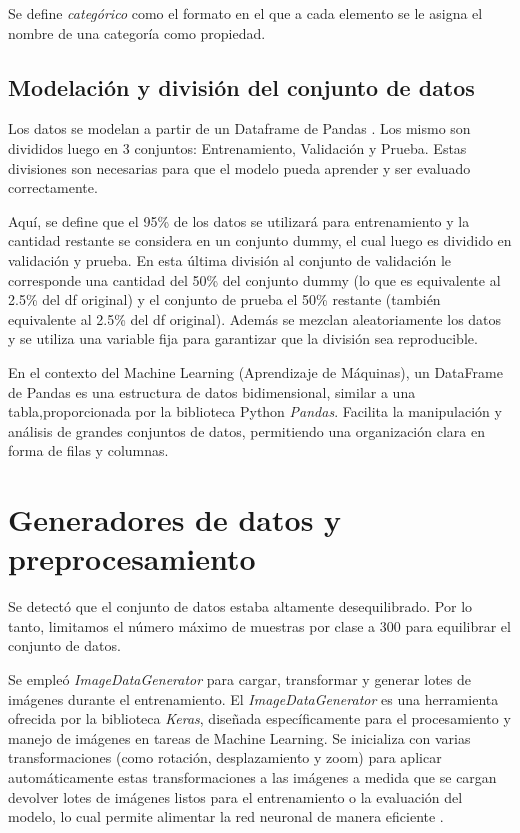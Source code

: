 Se define \textit{categórico} como el formato en el que a cada elemento se le asigna el nombre de una categoría como propiedad.

\subsection{Modelación y división del conjunto de datos}

Los datos se modelan a partir de un Dataframe de Pandas  \cite{pandas}. Los mismo son divididos luego en 3 conjuntos: Entrenamiento, Validación y Prueba. 
Estas divisiones son necesarias para que el modelo pueda aprender y ser evaluado correctamente. 
 
Aquí, se define que el 95\% de los datos se utilizará para entrenamiento y la cantidad restante se considera en un conjunto dummy, el cual  luego es dividido en validación y prueba. En esta última división al conjunto de validación le corresponde una cantidad del 50\% del conjunto  dummy (lo que es equivalente al 2.5\% del df original) y el conjunto de prueba el 50\% restante (también equivalente al 2.5\% del df original). Además se mezclan aleatoriamente los datos y se utiliza una variable fija para garantizar que la división sea reproducible.

En el contexto del Machine Learning (Aprendizaje de Máquinas), un DataFrame de Pandas es una estructura de datos bidimensional, similar a una tabla,proporcionada por la biblioteca Python \textit{Pandas}. Facilita la manipulación y análisis de grandes conjuntos de datos, permitiendo una organización clara en forma de filas y columnas.

\section{Generadores de datos y preprocesamiento}

Se detectó que el conjunto de datos estaba altamente desequilibrado. Por lo tanto, limitamos el número máximo de muestras por clase a 300 para equilibrar el conjunto de datos. 

Se empleó \textit{ImageDataGenerator} \cite{img_gen} para cargar, transformar y generar lotes de imágenes durante el entrenamiento. El \textit{ImageDataGenerator} es una herramienta ofrecida por la biblioteca \textit{Keras}, diseñada específicamente para el procesamiento y manejo de imágenes en 
tareas de Machine Learning. Se inicializa con varias transformaciones (como rotación, desplazamiento y zoom) para aplicar automáticamente estas transformaciones a las imágenes a medida que se cargan devolver lotes de imágenes listos para el entrenamiento o la evaluación del modelo, lo cual permite alimentar la red neuronal de manera eficiente \cite{augmentation} .

